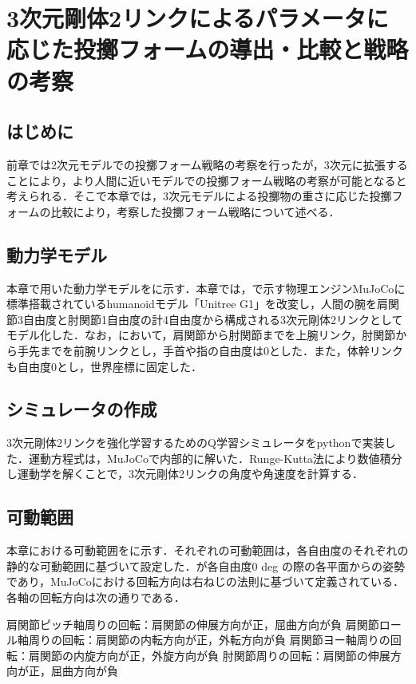 \chapter[3次元剛体2リンクによるパラメータに応じた投擲フォームの導出・比較と戦略の考察]{3次元剛体2リンクによるパラメータに応じた投擲フォームの導出・比較と戦略の考察}

\section{はじめに}
前章では2次元モデルでの投擲フォーム戦略の考察を行ったが，3次元に拡張することにより，より人間に近いモデルでの投擲フォーム戦略の考察が可能となると考えられる．そこで本章では，3次元モデルによる投擲物の重さに応じた投擲フォームの比較により，考察した投擲フォーム戦略について述べる．
\section{動力学モデル}
本章で用いた動力学モデルをに示す．本章では，で示す物理エンジンMuJoCo\cite{mujoco}\cite{mujoco2}に標準搭載されているhumanoidモデル「Unitree G1」\cite{unitreeg1}を改変し，人間の腕を肩関節3自由度と肘関節1自由度の計4自由度から構成される3次元剛体2リンクとしてモデル化した．なお，において，肩関節から肘関節までを上腕リンク，肘関節から手先までを前腕リンクとし，手首や指の自由度は0とした．また，体幹リンクも自由度0とし，世界座標に固定した．

\section{シミュレータの作成}
3次元剛体2リンクを強化学習するためのQ学習シミュレータをpythonで実装した．運動方程式は，MuJoCoで内部的に解いた．Runge-Kutta法により数値積分し運動学を解くことで，3次元剛体2リンクの角度や角速度を計算する．
\section{可動範囲}
本章における可動範囲をに示す．それぞれの可動範囲は，各自由度のそれぞれの静的な可動範囲\cite{range}に基づいて設定した．が各自由度0 deg の際の各平面からの姿勢であり，MuJoCoにおける回転方向は右ねじの法則に基づいて定義されている．各軸の回転方向は次の通りである．

肩関節ピッチ軸周りの回転：肩関節の伸展方向が正，屈曲方向が負
肩関節ロール軸周りの回転：肩関節の内転方向が正，外転方向が負
肩関節ヨー軸周りの回転：肩関節の内旋方向が正，外旋方向が負
肘関節周りの回転：肩関節の伸展方向が正，屈曲方向が負

